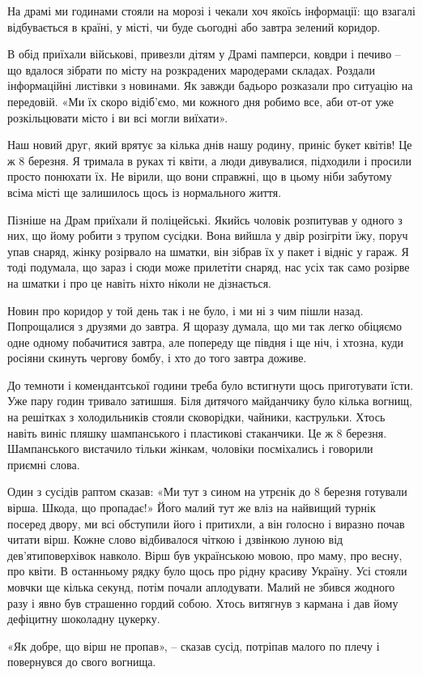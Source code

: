 На драмі ми годинами стояли на морозі і чекали хоч якоїсь інформації: що
взагалі відбувається в країні, у місті, чи буде сьогодні або завтра зелений
коридор. 

В обід приїхали військові, привезли дітям у Драмі памперси, ковдри і печиво –
що вдалося зібрати по місту на розкрадених мародерами складах. Роздали
інформаційні листівки з новинами. Як завжди бадьоро розказали про ситуацію на
передовій. «Ми їх скоро відіб’ємо, ми кожного дня робимо все, аби от-от уже
розкільцювати місто і ви всі могли виїхати». 

Наш новий друг, який врятує за кілька днів нашу родину, приніс букет квітів! Це
ж 8 березня. Я тримала в руках ті квіти, а люди дивувалися, підходили і просили
просто понюхати їх. Не вірили, що вони справжні, що в цьому ніби забутому всіма
місті ще залишилось щось із нормального життя.

Пізніше на Драм приїхали й поліцейські. Якийсь чоловік розпитував у одного з
них, що йому робити з трупом сусідки. Вона вийшла у двір розігріти їжу, поруч
упав снаряд, жінку розірвало на шматки, він зібрав їх у пакет і відніс у гараж.
Я тоді подумала, що зараз і сюди може прилетіти снаряд, нас усіх так само
розірве на шматки і про це навіть ніхто ніколи не дізнається.


Новин про коридор у той день так і не було, і ми ні з чим пішли назад.
Попрощалися з друзями до завтра. Я щоразу думала, що ми так легко обіцяємо одне
одному побачитися завтра, але попереду ще півдня і ще ніч, і хтозна, куди
росіяни скинуть чергову бомбу, і хто до того завтра доживе. 

До темноти і комендантської години треба було встигнути щось приготувати їсти.
Уже пару годин тривало затишшя. Біля дитячого майданчику було кілька вогнищ, на
решітках з холодильників стояли сковорідки, чайники, каструльки. Хтось навіть
виніс пляшку шампанського і пластикові стаканчики. Це ж 8 березня. Шампанського
вистачило тільки жінкам, чоловіки посміхались і говорили приємні слова. 

Один з сусідів раптом сказав: «Ми тут з сином на утрєнік до 8 березня готували
вірша. Шкода, що пропадає!» Його малий тут же вліз на найвищий турнік посеред
двору, ми всі обступили його і притихли, а він голосно і виразно почав читати
вірш. Кожне слово відбивалося чіткою і дзвінкою луною від дев’ятиповерхівок
навколо. Вірш був українською мовою, про маму, про весну, про квіти. В
останньому рядку було щось про рідну красиву Україну. Усі стояли мовчки ще
кілька секунд, потім почали аплодувати. Малий не збився жодного разу і явно був
страшенно гордий собою. Хтось витягнув з кармана і дав йому дефіцитну шоколадну
цукерку. 

«Як добре, що вірш не пропав», – сказав сусід, потріпав малого по плечу і
повернувся до свого вогнища.
